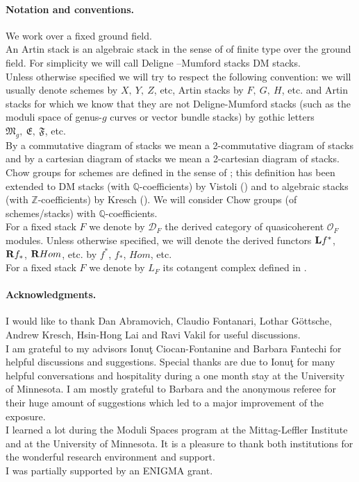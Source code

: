 \paragraph{Notation and conventions.}
We work over a fixed ground field.
\\An Artin stack is an algebraic stack in the sense of \cite{lau} of finite type over the ground field. For simplicity we will call Deligne --Mumford stacks DM stacks.
\\Unless otherwise specified we will try to respect the following convention: we will usually denote schemes by $X,\ Y,\ Z$, etc, Artin stacks by $F,\ G,\ H$, etc. and Artin stacks for which we know that they are not Deligne-Mumford stacks (such as the moduli space of genus-$g$ curves or vector bundle stacks) by gothic letters $\mathfrak{M}_{g},\ \mathfrak{E},\ \mathfrak{F}$, etc.
\\By a commutative diagram of stacks we mean a 2-commutative diagram of stacks and by a cartesian diagram of stacks we mean a 2-cartesian diagram of stacks.
\\Chow groups for schemes are defined in the sense of \cite{f}; this definition has been extended to DM stacks (with $\mathbb{Q}$-coefficients) by Vistoli (\cite{v}) and to algebraic stacks (with $\mathbb{Z}$-coefficients) by Kresch (\cite{k}). We will consider Chow groups (of schemes/stacks) with $\mathbb{Q}$-coefficients.
\\For a fixed stack $F$ we denote by $\mathcal{D}_F$ the derived category of quasicoherent $\mathcal{O}_F$ modules. Unless otherwise specified, we will denote the derived functors ${\bf{L}}f^*$, ${\bf{R}}f_*$, ${\bf{R}}Hom$, etc. by $f^*$, $f_*$, $Hom$, etc.
\\For a fixed stack $F$ we denote by $L_F$ its cotangent complex defined in \cite{ol}.

\paragraph{Acknowledgments.} I would like to thank Dan Abramovich, Claudio Fontanari, Lothar G\"{o}ttsche, Andrew Kresch, Hsin-Hong Lai and Ravi Vakil for useful discussions.
\\I am grateful to my advisors Ionu\c{t} Ciocan-Fontanine and Barbara Fantechi for helpful discussions and suggestions. Special thanks are due to Ionu\c{t} for many helpful conversations and hospitality during a one month stay at the University of Minnesota. I am mostly grateful to Barbara and the anonymous referee for their huge amount of suggestions which led to a major improvement of the exposure.
\\I learned a lot during the Moduli Spaces program at the Mittag-Leffler Institute and at the University of Minnesota. It is a pleasure to thank both institutions for the wonderful research environment and support.
\\I was partially supported by an ENIGMA grant.

